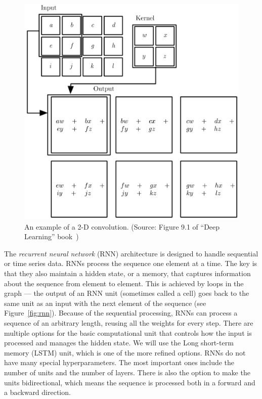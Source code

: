\begin{figure}
    \centering
    \includegraphics[scale=0.25]{img/convolution.png}
    \caption{An example of a 2-D convolution. (Source: Figure 9.1 of ``Deep Learning'' book~\cite{Goodfellow-et-al-2016})}
    \label{fig:conv}
\end{figure}

The \textit{recurrent neural network} (RNN) architecture is designed to handle sequential or time series data. RNNs process the sequence one element at a time. The key is that they also maintain a hidden state, or a memory, that captures information about the sequence from element to element. This is achieved by loops in the graph --- the output of an RNN unit (sometimes called a cell) goes back to the same unit as an input with the next element of the sequence (see Figure~\ref{fig:rnn}). Because of the sequential processing, RNNs can process a sequence of an arbitrary length, reusing all the weights for every step. There are multiple options for the basic computational unit that controls how the input is processed and manages the hidden state. We will use the Long short-term memory (LSTM) unit, which is one of the more refined options. RNNs do not have many special hyperparameters. The most important ones include the number of units and the number of layers. There is also the option to make the units bidirectional, which means the sequence is processed both in a forward and a backward direction.

